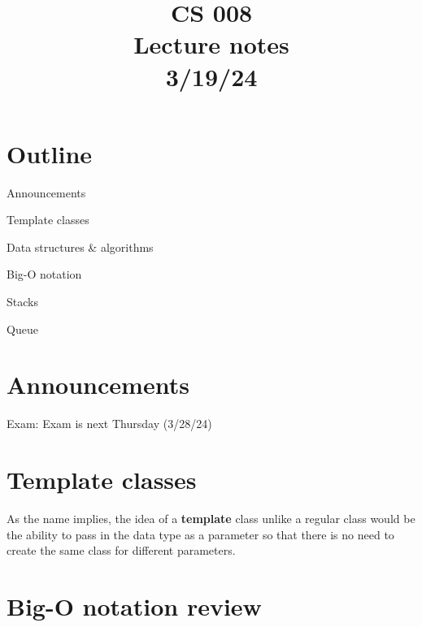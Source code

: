 \documentclass[11pt,a4paper,english]{paper}
\begin{document}
\title{CS 008 \\ Lecture notes \\ 3/19/24}
\maketitle

\section{Outline}

\begin{itemize} {

    \item Announcements

    \item Template classes

    \item Data structures \& algorithms

      \begin{itemize} {

          \item Big-O notation
          \item Stacks
          \item Queue

      }\end{itemize}

}\end{itemize}

\section{Announcements}

\begin{gbox}{Exam:} {
  Exam is next Thursday (3/28/24)
  }
\end{gbox}


\section{Template classes}

As the name implies, the idea of a \textbf{template} class unlike a regular class would be the ability to pass in the data type as a parameter so that there is no need to create the same class for different parameters.
\newpage

\section{Big-O notation review}
\end{document}
